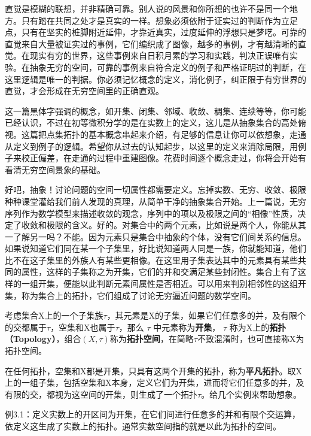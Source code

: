 直觉是模糊的联想，并非精确可靠。别人说的风景和你所想的也许不是同一个地方。只有踏在共同之处才是真实的一样。想象必须依附于证实过的判断作为立足点，只有在坚实的桩脚附近延伸，才靠近真实，过度延伸的浮想只是梦呓。可靠的直觉来自大量被证实过的事例，它们编织成了图像，越多的事例，才有越清晰的直觉。在现实有穷的世界，这些事例来自日积月累的学习和实践，判决正误唯有实验。在抽象无穷的空间，可靠的事例来自符合定义的例子和严格证明过的判断，在这里逻辑是唯一的判据。你必须记忆概念的定义，消化例子，纠正限于有穷世界的直觉，才会形成在无穷空间里的正确直观。

这一篇黑体字强调的概念，如开集、闭集、邻域、收敛、稠集、连续等等，你可能已经认识，不过在初等微积分学的是在实数上的定义，这儿是从抽象集合的高处俯视。这篇把点集拓扑的基本概念串起来介绍，有足够的信息让你可以依想象，走通从定义到例子的逻辑。希望你从过去的认知起步，以这里的定义来消除局限，用例子来校正偏差，在走通的过程中重建图像。花费时间逐个概念走过，你将会开始有看清无穷空间景象的基础。

好吧，抽象！讨论问题的空间一切属性都需要定义。忘掉实数、无穷、收敛、极限种种课堂灌给我们前人发现的真理，从简单干净的抽象集合开始。上一篇说，无穷序列作为数学模型来描述收敛的观念，序列中的项以及极限之间的``相像''性质，决定了收敛和极限的含义。好的。对集合中的两个元素，比如说是两个人，你能从其一了解另一吗？不能。因为元素只是集合中抽象的个体，没有它们间关系的信息。如果说知道它们同在某一个子集里，好比说知道两人同是一族，你就能知道，他们比不在这子集里的外族人有某些更相像。在这里用子集表达其中的元素具有某些共同的属性，这样的子集称之为开集，它们的并和交满足某些封闭性。集合上有了这样的一组开集，便能以此判断元素间属性是否相近。可以用来判别相邻性的这组开集，称为集合上的拓扑，它们组成了讨论无穷逼近问题的数学空间。

\kaishu
\setlength{\leftskip}{1em}
考虑集合X上的一个子集族$ \tau $，其元素是X的子集，如果它们任意多的并，及有限个的交都属于$ \tau $，空集和X也属于$ \tau $，那么 $ \tau $ 中元素称为\textbf{开集}， $ \tau $ 称为X上的\textbf{拓扑（Topology）}，组合$ (X, \tau)$称为\textbf{拓扑空间}，在简略$\tau$不致混淆时，也可直接称X为拓扑空间。

\songti
\setlength{\leftskip}{0em}

在任何拓扑，空集和X都是开集，只具有这两个开集的拓扑，称为\textbf{平凡拓扑}。取X上的一组子集，包括空集和X本身，定义它们为开集，进而将它们任意多的并，及有限的交，都视为这空间的开集，则生成了一个拓扑$\tau$。给几个实例来帮助想象。

\kaishu
\setlength{\leftskip}{1em}

\noindent
例3.1：定义实数上的开区间为开集，在它们间进行任意多的并和有限个交运算，依定义这生成了实数上的拓扑。通常实数空间指的就是以此为拓扑的空间。

